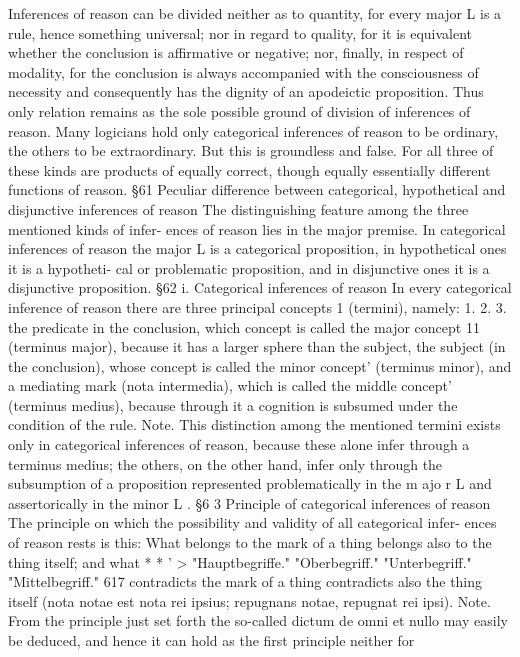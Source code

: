 Inferences of reason can be divided neither as to quantity, for every major L
is a rule, hence something universal; nor in regard to quality, for it is
equivalent whether the conclusion is affirmative or negative; nor, finally,
in respect of modality, for the conclusion is always accompanied with the
consciousness of necessity and consequently has the dignity of an
apodeictic proposition. Thus only relation remains as the sole possible
ground of division of inferences of reason.
Many logicians hold only categorical inferences of reason to be ordinary,
the others to be extraordinary. But this is groundless and false. For all
three of these kinds are products of equally correct, though equally
essentially different functions of reason.
§61
Peculiar difference between categorical, hypothetical and disjunctive
inferences of reason
The distinguishing feature among the three mentioned kinds of infer-
ences of reason lies in the major premise. In categorical inferences of reason
the major L is a categorical proposition, in hypothetical ones it is a hypotheti-
cal or problematic proposition, and in disjunctive ones it is a disjunctive
proposition.
§62
i. Categorical inferences of reason
In every categorical inference of reason there are three principal concepts 1
(termini), namely:
1.
2.
3.
the predicate in the conclusion, which concept is called the major concept 11
(terminus major), because it has a larger sphere than the subject,
the subject (in the conclusion), whose concept is called the minor concept'
(terminus minor), and
a mediating mark (nota intermedia), which is called the middle concept' (terminus
medius), because through it a cognition is subsumed under the condition of
the rule.
Note.
This distinction among the mentioned termini exists only in categorical
inferences of reason, because these alone infer through a terminus medius;
the others, on the other hand, infer only through the subsumption of a
proposition represented problematically in the m ajo r L and assertorically in
the minor L .
§6 3
Principle of categorical inferences of reason
The principle on which the possibility and validity of all categorical infer-
ences of reason rests is this:
What belongs to the mark of a thing belongs also to the thing itself; and what
*
*
'
>
"Hauptbegriffe."
"Oberbegriff."
"Unterbegriff."
"Mittelbegriff."
617
contradicts the mark of a thing contradicts also the thing itself (nota notae est nota
rei ipsius; repugnans notae, repugnat rei ipsi).
Note.
From the principle just set forth the so-called dictum de omni et nullo may
easily be deduced, and hence it can hold as the first principle neither for
